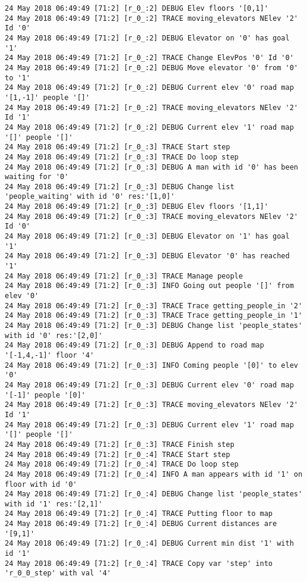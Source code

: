 \begin{lstlisting}[basicstyle=\scriptsize]
24 May 2018 06:49:49 [71:2] [r_0_:2] DEBUG Elev floors '[0,1]'
24 May 2018 06:49:49 [71:2] [r_0_:2] TRACE moving_elevators NElev '2' Id '0'
24 May 2018 06:49:49 [71:2] [r_0_:2] DEBUG Elevator on '0' has goal '1'
24 May 2018 06:49:49 [71:2] [r_0_:2] TRACE Change ElevPos '0' Id '0'
24 May 2018 06:49:49 [71:2] [r_0_:2] DEBUG Move elevator '0' from '0' to '1'
24 May 2018 06:49:49 [71:2] [r_0_:2] DEBUG Current elev '0' road map '[1,-1]' people '[]'
24 May 2018 06:49:49 [71:2] [r_0_:2] TRACE moving_elevators NElev '2' Id '1'
24 May 2018 06:49:49 [71:2] [r_0_:2] DEBUG Current elev '1' road map '[]' people '[]'
24 May 2018 06:49:49 [71:2] [r_0_:3] TRACE Start step
24 May 2018 06:49:49 [71:2] [r_0_:3] TRACE Do loop step
24 May 2018 06:49:49 [71:2] [r_0_:3] DEBUG A man with id '0' has been waiting for '0'
24 May 2018 06:49:49 [71:2] [r_0_:3] DEBUG Change list 'people_waiting' with id '0' res:'[1,0]'
24 May 2018 06:49:49 [71:2] [r_0_:3] DEBUG Elev floors '[1,1]'
24 May 2018 06:49:49 [71:2] [r_0_:3] TRACE moving_elevators NElev '2' Id '0'
24 May 2018 06:49:49 [71:2] [r_0_:3] DEBUG Elevator on '1' has goal '1'
24 May 2018 06:49:49 [71:2] [r_0_:3] DEBUG Elevator '0' has reached '1'
24 May 2018 06:49:49 [71:2] [r_0_:3] TRACE Manage people
24 May 2018 06:49:49 [71:2] [r_0_:3] INFO Going out people '[]' from elev '0'
24 May 2018 06:49:49 [71:2] [r_0_:3] TRACE Trace getting_people_in '2'
24 May 2018 06:49:49 [71:2] [r_0_:3] TRACE Trace getting_people_in '1'
24 May 2018 06:49:49 [71:2] [r_0_:3] DEBUG Change list 'people_states' with id '0' res:'[2,0]'
24 May 2018 06:49:49 [71:2] [r_0_:3] DEBUG Append to road map '[-1,4,-1]' floor '4'
24 May 2018 06:49:49 [71:2] [r_0_:3] INFO Coming people '[0]' to elev '0'
24 May 2018 06:49:49 [71:2] [r_0_:3] DEBUG Current elev '0' road map '[-1]' people '[0]'
24 May 2018 06:49:49 [71:2] [r_0_:3] TRACE moving_elevators NElev '2' Id '1'
24 May 2018 06:49:49 [71:2] [r_0_:3] DEBUG Current elev '1' road map '[]' people '[]'
24 May 2018 06:49:49 [71:2] [r_0_:3] TRACE Finish step
24 May 2018 06:49:49 [71:2] [r_0_:4] TRACE Start step
24 May 2018 06:49:49 [71:2] [r_0_:4] TRACE Do loop step
24 May 2018 06:49:49 [71:2] [r_0_:4] INFO A man appears with id '1' on floor with id '0'
24 May 2018 06:49:49 [71:2] [r_0_:4] DEBUG Change list 'people_states' with id '1' res:'[2,1]'
24 May 2018 06:49:49 [71:2] [r_0_:4] TRACE Putting floor to map
24 May 2018 06:49:49 [71:2] [r_0_:4] DEBUG Current distances are '[9,1]'
24 May 2018 06:49:49 [71:2] [r_0_:4] DEBUG Current min dist '1' with id '1'
24 May 2018 06:49:49 [71:2] [r_0_:4] TRACE Copy var 'step' into 'r_0_0_step' with val '4'

\end{lstlisting}
